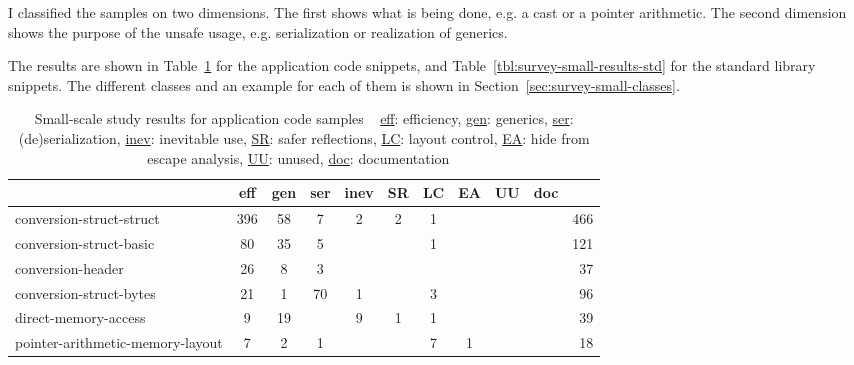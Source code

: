 I classified the samples on two dimensions.
The first shows what is being done, e.g. a cast or a pointer arithmetic.
The second dimension shows the purpose of the unsafe usage, e.g. serialization or realization of generics.

The results are shown in Table~\ref{tbl:survey-small-results-app} for the application code snippets, and
Table~\ref{tbl:survey-small-results-std} for the standard library snippets.
The different classes and an example for each of them is shown in Section~\ref{sec:survey-small-classes}.

\begin{table}[h]
    \centering
    \caption[Small-scale study results for application code samples]%
    {Small-scale study results for application code samples \newline \tiny ~ \newline \small
        \underline{eff}: efficiency, \underline{gen}: generics, \underline{ser}: (de)serialization,
        \underline{inev}: inevitable use, \underline{SR}: safer reflections, \underline{LC}: layout control,
        \underline{EA}: hide from escape analysis, \underline{UU}: unused,
        \underline{doc}: documentation \newline \tiny ~}
    \label{tbl:survey-small-results-app}
    \begin{tabularx}{\textwidth}{Xccccccccc|r}
        \toprule
                                          &  eff &  gen & ser & inev &  SR &  LC &  EA &  UU & doc &  {}   \\
        \midrule
                 conversion-struct-struct &  396 &   58 &   7 &    2 &   2 &   1 &     &     &     &   466 \\
        \rowcolor{verylightgray}
                  conversion-struct-basic &   80 &   35 &   5 &      &     &   1 &     &     &     &   121 \\
                        conversion-header &   26 &    8 &   3 &      &     &     &     &     &     &    37 \\
        \rowcolor{verylightgray}
                  conversion-struct-bytes &   21 &    1 &  70 &    1 &     &   3 &     &     &     &    96 \\
                     direct-memory-access &    9 &   19 &     &    9 &   1 &   1 &     &     &     &    39 \\
        \rowcolor{verylightgray}
         pointer-arithmetic-memory-layout &    7 &    2 &   1 &      &     &   7 &   1 &     &     &    18 \\

\end{tabularx}
\end{table}
